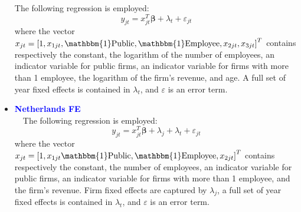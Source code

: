 \documentclass[12pt,notitlepage]{article}
\newcommand{\sym}[1] {\ifmmode^{#1} \else\(^{#1}\) \fi}
\begin{document}
\begin{itemize}
The following regression is employed:
	\begin{equation}
	y_{jt} = x^{T}_{jt}\mathbf{\beta} + \lambda_{t} + \varepsilon_{jt}
	\end{equation}
where the vector $x_{jt} = \left[  1, x_{1jt}, \mathbbm{1}\text{Public}, \mathbbm{1}\text{Employee}, x_{2jt}, x_{3jt}  \right]^{T} $ contains respectively the constant, the logarithm of the number of employees, an indicator variable for public firms, an indicator variable for firms with more than 1 employee, the logarithm of the firm's revenue, and age. A full set of year fixed effects is contained in $\lambda_{t}$, and $\varepsilon$ is an error term.
\begin{table}[htbp]\centering
\def\sym#1{\ifmmode^{#1}\else\(^{#1}\)\fi}
\caption{Haltiwanger growth rate}
\end{table}
\clearpage
\item \textcolor{blue}{\textbf{Netherlands FE}}\\~\
The following regression is employed:
	\begin{equation}
	y_{jt} = x^{T}_{jt}\mathbf{\beta} + \lambda_{j}  + \lambda_{t} + \varepsilon_{jt}
	\end{equation}
where the vector $x_{jt} = \left[  1, x_{1jt} \mathbbm{1}\text{Public}, \mathbbm{1}\text{Employee}, x_{2jt} \right]^{T} $ contains respectively the constant, the number of employees, an indicator variable for public firms, an indicator variable for firms with more than 1 employee, and the firm's revenue. Firm fixed effects are captured by $\lambda_{j}$, a full set of year fixed effects is contained in $\lambda_{t}$, and $\varepsilon$ is an error term.
\begin{table}[htbp]\centering
\def\sym#1{\ifmmode^{#1}\else\(^{#1}\)\fi}
\caption{Haltiwanger growth rate}
\end{table}


\end{itemize}
\end{document}
